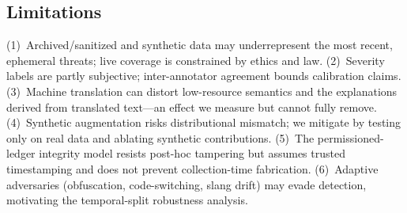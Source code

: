 \documentclass[11pt,a4paper]{article}
\begin{document}
\subsection{Limitations}\label{sec:method-limits}
(1)~Archived/sanitized and synthetic data may underrepresent the most recent, ephemeral
threats; live coverage is constrained by ethics and law. (2)~Severity labels are partly
subjective; inter-annotator agreement bounds calibration claims. (3)~Machine translation
can distort low-resource semantics and the explanations derived from translated text---an
effect we measure but cannot fully remove. (4)~Synthetic augmentation risks distributional
mismatch; we mitigate by testing only on real data and ablating synthetic contributions.
(5)~The permissioned-ledger integrity model resists post-hoc tampering but assumes
trusted timestamping and does not prevent collection-time fabrication. (6)~Adaptive
adversaries (obfuscation, code-switching, slang drift) may evade detection, motivating the
temporal-split robustness analysis.



\end{document}
